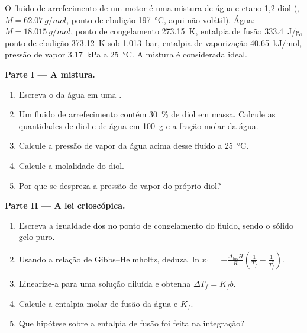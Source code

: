\begin{problem}
\label{pb:b2:chemical-potential:1}
O fluido de arrefecimento de um motor é uma mistura de água e etano-1,2-diol
(, $M = \qty{62.07}{g/mol}$, ponto de ebulição \qty{197}{\celsius},
aqui não volátil). Água: $M = \qty{18.015}{g/mol}$, ponto de congelamento
\qty{273.15}{K}, entalpia de fusão \qty{333.4}{J/g}, ponto de ebulição
\qty{373.12}{K} sob \qty{1.013}{bar}, entalpia de vaporização
\qty{40.65}{kJ/mol}, pressão de vapor \qty{3.17}{kPa} a \qty{25}{\celsius}.
A mistura é considerada ideal.

\medskip
\noindent\textbf{Parte I --- A mistura.}
\begin{enumerate}
  \item Escreva o  da água em uma .
  \item Um fluido de arrefecimento contém \qty{30}{\percent} de diol em massa. Calcule as
        quantidades de diol e de água em \qty{100}{g} e a fração molar da
        água.
  \item Calcule a pressão de vapor da água acima desse fluido a
        \qty{25}{\celsius}.
  \item Calcule a molalidade do diol.
  \item Por que se despreza a pressão de vapor do próprio diol?
\end{enumerate}

\medskip
\noindent\textbf{Parte II --- A lei crioscópica.}
\begin{enumerate}[resume]
  \item Escreva a igualdade dos  no ponto de congelamento
        do fluido, sendo o sólido gelo puro.
  \item Usando a relação de Gibbs--Helmholtz, deduza $\ln x_1 =
        -\frac{\Delta_{\text{fus}}H}{R}\left(\frac1{T_f} - \frac1{T_f^*}\right)$.
  \item Linearize-a para uma solução diluída e obtenha $\Delta T_f = K_f b$.
  \item Calcule a entalpia molar de fusão da água e $K_f$.
  \item Que hipótese sobre a entalpia de fusão foi feita na integração?
\end{enumerate}


\end{problem}
